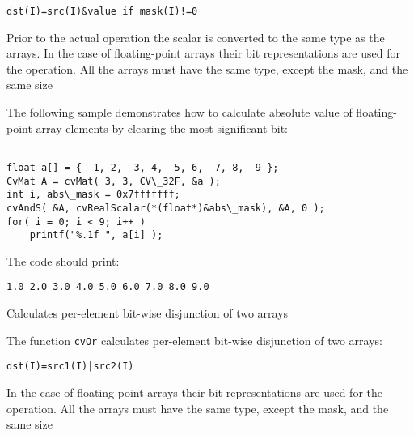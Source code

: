 \begin{lstlisting}
dst(I)=src(I)&value if mask(I)!=0
\end{lstlisting}

Prior to the actual operation the scalar is converted to the same type as the arrays. In the case of floating-point arrays their bit representations are used for the operation. All the arrays must have the same type, except the mask, and the same size

The following sample demonstrates how to calculate absolute value of floating-point array elements by clearing the most-significant bit:

\begin{lstlisting}

float a[] = { -1, 2, -3, 4, -5, 6, -7, 8, -9 };
CvMat A = cvMat( 3, 3, CV\_32F, &a );
int i, abs\_mask = 0x7fffffff;
cvAndS( &A, cvRealScalar(*(float*)&abs\_mask), &A, 0 );
for( i = 0; i < 9; i++ )
    printf("%.1f ", a[i] );

\end{lstlisting}

The code should print:

\begin{lstlisting}
1.0 2.0 3.0 4.0 5.0 6.0 7.0 8.0 9.0
\end{lstlisting}



Calculates per-element bit-wise disjunction of two arrays


\begin{description}
\end{description}


The function \texttt{cvOr} calculates per-element bit-wise disjunction of two arrays:

\begin{lstlisting}
dst(I)=src1(I)|src2(I)
\end{lstlisting}

In the case of floating-point arrays their bit representations are used for the operation. All the arrays must have the same type, except the mask, and the same size

